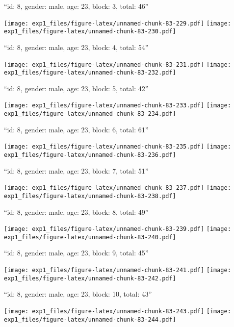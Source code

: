 \documentclass[11pt,,]{article}
\begin{document}
\newpage
[1] 

``id: 8, gender: male, age: 23, block: 3, total: 46''

\texttt{[image: exp1\_files/figure-latex/unnamed-chunk-83-229.pdf]}
\texttt{[image: exp1\_files/figure-latex/unnamed-chunk-83-230.pdf]}

\newpage
[1] 

``id: 8, gender: male, age: 23, block: 4, total: 54''

\texttt{[image: exp1\_files/figure-latex/unnamed-chunk-83-231.pdf]}
\texttt{[image: exp1\_files/figure-latex/unnamed-chunk-83-232.pdf]}

\newpage
[1] 

``id: 8, gender: male, age: 23, block: 5, total: 42''

\texttt{[image: exp1\_files/figure-latex/unnamed-chunk-83-233.pdf]}
\texttt{[image: exp1\_files/figure-latex/unnamed-chunk-83-234.pdf]}

\newpage
[1] 

``id: 8, gender: male, age: 23, block: 6, total: 61''

\texttt{[image: exp1\_files/figure-latex/unnamed-chunk-83-235.pdf]}
\texttt{[image: exp1\_files/figure-latex/unnamed-chunk-83-236.pdf]}

\newpage
[1] 

``id: 8, gender: male, age: 23, block: 7, total: 51''

\texttt{[image: exp1\_files/figure-latex/unnamed-chunk-83-237.pdf]}
\texttt{[image: exp1\_files/figure-latex/unnamed-chunk-83-238.pdf]}

\newpage
[1] 

``id: 8, gender: male, age: 23, block: 8, total: 49''

\texttt{[image: exp1\_files/figure-latex/unnamed-chunk-83-239.pdf]}
\texttt{[image: exp1\_files/figure-latex/unnamed-chunk-83-240.pdf]}

\newpage
[1] 

``id: 8, gender: male, age: 23, block: 9, total: 45''

\texttt{[image: exp1\_files/figure-latex/unnamed-chunk-83-241.pdf]}
\texttt{[image: exp1\_files/figure-latex/unnamed-chunk-83-242.pdf]}

\newpage
[1] 

``id: 8, gender: male, age: 23, block: 10, total: 43''

\texttt{[image: exp1\_files/figure-latex/unnamed-chunk-83-243.pdf]}
\texttt{[image: exp1\_files/figure-latex/unnamed-chunk-83-244.pdf]}
\end{document}

